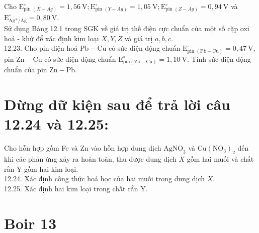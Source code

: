 \documentclass[10pt]{article}
\begin{document}
Cho $\mathrm{E}_{\text {pin }(X-A g)}^{\circ}=1,56 \mathrm{~V} ; \mathrm{E}_{\text {pin }(Y-A g)}^{\circ}=1,05 \mathrm{~V} ; \mathrm{E}_{\text {pin }(Z-A g)}^{\circ}=0,94 \mathrm{~V}$ và $\mathrm{E}_{\mathrm{Ag}^{+} / \mathrm{Ag}}^{\circ}=0,80 \mathrm{~V}$.\\
Sử dụng Bảng 12.1 trong SGK về giá trị thế điện cực chuẩn của một số cặp oxi hoá - khử để xác định kim loại $X, Y, Z$ và giá trị $a, b, c$.\\
12.23. Cho pin điện hoá $\mathrm{Pb}-\mathrm{Cu}$ có sức điện động chuẩn $\mathrm{E}_{\text {pin }(\mathrm{Pb}-\mathrm{Cu})}^{\circ}=0,47 \mathrm{~V}$, pin $\mathrm{Zn}-\mathrm{Cu}$ có sức điện động chuẩn $\mathrm{E}_{\mathrm{pin}(\mathrm{Zn}-\mathrm{Cu})}^{\circ}=1,10 \mathrm{~V}$. Tính sức điện động chuẩn của pin $\mathrm{Zn}-\mathrm{Pb}$.

\section*{Dừng dữ kiện sau để trả lời câu 12.24 và 12.25:}
Cho hỗn hợp gồm Fe và Zn vào hỗn hợp dung dịch $\mathrm{AgNO}_{3}$ và $\mathrm{Cu}\left(\mathrm{NO}_{3}\right)_{2}$ đến khi các phản ứng xảy ra hoàn toàn, thu được dung dịch $X$ gồm hai muối và chất rắn Y gồm hai kim loại.\\
12.24. Xác định công thức hoá học của hai muối trong dung dịch $X$.\\
12.25. Xác định hai kim loại trong chất rắn Y.

\section*{Boir 13}
\end{document}
